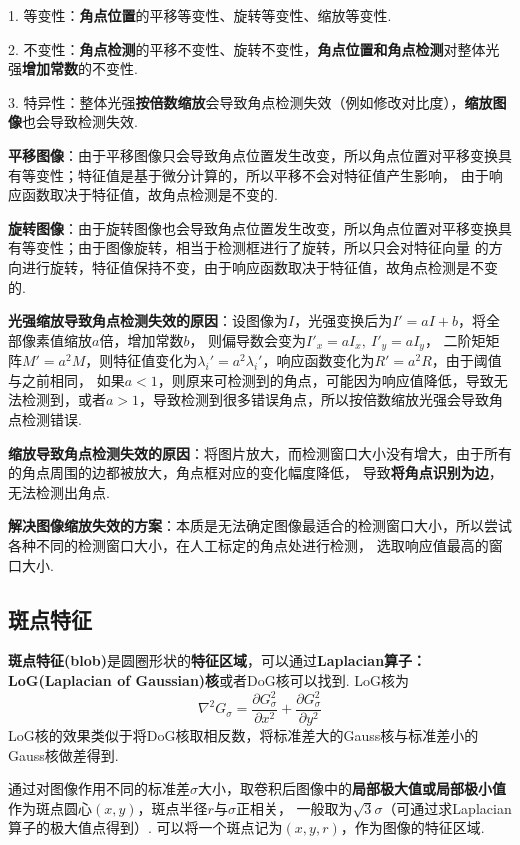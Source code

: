 \documentclass[12pt, a4paper, oneside]{ctexart}
\numberwithin{equation}{section}  %
\theoremstyle{definition}
\begin{document}
1. 等变性：\textbf{角点位置}的平移等变性、旋转等变性、缩放等变性.

2. 不变性：\textbf{角点检测}的平移不变性、旋转不变性，\textbf{角点位置和角点检测}对整体光强\textbf{增加常数}的不变性.

3. 特异性：整体光强\textbf{按倍数缩放}会导致角点检测失效（例如修改对比度），\textbf{缩放图像}也会导致检测失效.

\textbf{平移图像}：由于平移图像只会导致角点位置发生改变，所以角点位置对平移变换具有等变性；特征值是基于微分计算的，所以平移不会对特征值产生影响，
由于响应函数取决于特征值，故角点检测是不变的.

\textbf{旋转图像}：由于旋转图像也会导致角点位置发生改变，所以角点位置对平移变换具有等变性；由于图像旋转，相当于检测框进行了旋转，所以只会对特征向量
的方向进行旋转，特征值保持不变，由于响应函数取决于特征值，故角点检测是不变的.

\textbf{光强缩放导致角点检测失效的原因}：设图像为$I$，光强变换后为$I' = aI+b$，将全部像素值缩放$a$倍，增加常数$b$，
则偏导数会变为$I'_x = aI_x,\ I'_y = aI_y$，
二阶矩矩阵$M' = a^2M$，则特征值变化为$\lambda_i' = a^2\lambda_i'$，响应函数变化为$R' = a^2R$，由于阈值与之前相同，
如果$a<1$，则原来可检测到的角点，可能因为响应值降低，导致无法检测到，或者$a>1$，导致检测到很多错误角点，所以按倍数缩放光强会导致角点检测错误.

\textbf{缩放导致角点检测失效的原因}：将图片放大，而检测窗口大小没有增大，由于所有的角点周围的边都被放大，角点框对应的变化幅度降低，
导致\textbf{将角点识别为边}，无法检测出角点.

\textbf{解决图像缩放失效的方案}：本质是无法确定图像最适合的检测窗口大小，所以尝试各种不同的检测窗口大小，在人工标定的角点处进行检测，
选取响应值最高的窗口大小.
\subsection{斑点特征}
\textbf{斑点特征(blob)}是圆圈形状的\textbf{特征区域}，可以通过\textbf{Laplacian算子：LoG(Laplacian of Gaussian)核}或者DoG核可以找到. LoG核为
\begin{equation*}
    \nabla^2G_\sigma = \frac{\partial G_\sigma^2}{\partial x^2}+\frac{\partial G_\sigma^2}{\partial y^2}
\end{equation*}
LoG核的效果类似于将DoG核取相反数，将标准差大的Gauss核与标准差小的Gauss核做差得到.

通过对图像作用不同的标准差$\sigma$大小，取卷积后图像中的\textbf{局部极大值或局部极小值}作为斑点圆心$(x,y)$，斑点半径$r$与$\sigma$正相关，
一般取为$\sqrt{3}\sigma$（可通过求Laplacian算子的极大值点得到）. 可以将一个斑点记为$(x,y,r)$，作为图像的特征区域.
\end{document}
